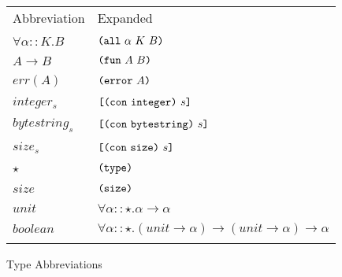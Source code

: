 \documentclass[../main.tex]{subfiles}
\begin{document}
\begin{figure*}[t]
    \footnotesize
    \centering
    \begin{tabular}{ll}
        \textrm{Abbreviation} & \textrm{Expanded}\\\\
        
        $\forall \alpha :: K. B$ & \(\texttt{(} \texttt{all} ~ \alpha ~ K ~ B \texttt{)}\)\\\\
        
        $A \to B$ & \(\texttt{(} \texttt{fun} ~ A ~ B \texttt{)}\)\\\\
        
        $err(A)$ & \(\texttt{(} \texttt{error} ~ A \texttt{)}\)\\\\
        
        $integer_s$ & \(\texttt{[} \texttt{(} \texttt{con} ~ \texttt{integer} \texttt{)} ~ s \texttt{]}\)\\\\
        
        $bytestring_s$ & \(\texttt{[} \texttt{(} \texttt{con} ~ \texttt{bytestring} \texttt{)} ~ s \texttt{]}\)\\\\
        
        $size_s$ & \(\texttt{[} \texttt{(} \texttt{con} ~ \texttt{size} \texttt{)} ~ s \texttt{]}\)\\\\
        
        $\star$ & \(\texttt{(} \texttt{type} \texttt{)}{}\)\\\\
        
        $size$ & \(\texttt{(} \texttt{size} \texttt{)}{}\)\\\\
        
        $unit$ & \(\forall \alpha :: \star. \alpha \to \alpha\)\\\\
        
        $boolean$ & \(\forall \alpha :: \star. (unit \to \alpha) \to (unit \to \alpha) \to \alpha\)\\\\
        
    \end{tabular}
    
    \caption{Type Abbreviations}
    \label{fig:Plutus_core_type_abbreviations}
\end{figure*}
\end{document}
